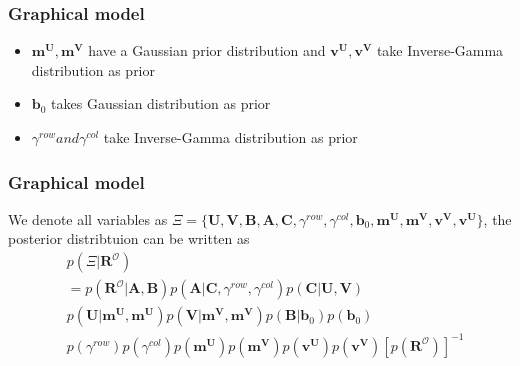 \documentclass{beamer}
\newcommand{\vect}[1]{\boldsymbol{\mathbf{#1}}} %
\newcommand{\vb}{\vect{b}}
\newcommand{\vB}{\vect{B}}
\newcommand{\vC}{\vect{C}}
\newcommand{\vU}{\vect{U}}
\newcommand{\vV}{\vect{V}}
\newcommand{\vv}{\vect{v}}
\newcommand{\vm}{\vect{m}}
\newcommand{\vR}{\vect{R}}
\newcommand{\vA}{\vect{A}}
\begin{document}
\begin{frame}
    \frametitle{Graphical model}
\begin{itemize}
    \item $\vm^{\vU}, \vm^{\vV}$ have a Gaussian prior distribution and $\vv^{\vU}, \vv^{\vV}$ take Inverse-Gamma distribution as prior 
    \item $\vb_0$ takes Gaussian distribution as prior
    \item $\gamma^{row} and \gamma^{col}$ take Inverse-Gamma distribution as prior
\end{itemize}
\end{frame}
\begin{frame}
    \frametitle{Graphical model}
    We denote all variables as $\Xi = \{\vU, \vV, \vB, \vA, \vC, \gamma^{row}, \gamma^{col}, \vb_0, \vm^{\vU},
    \vm^{\vV}, \vv^{\vV}, \vv^{\vU}\}$, the posterior distribtuion can be written as
    \begin{equation*}
	\begin{split}
	&p(\Xi|\vR^{\mathcal{O}}) \\
	&= p(\vR^{\mathcal{O}}|\vA, \vB) p(\vA|\vC, \gamma^{row}, \gamma^{col})p(\vC|\vU, \vV)\\
	&p(\vU|\vm^{\vU}, \vm^{\vU})p(\vV|\vm^{\vV}, \vm^{\vV})p(\vB|\vb_0)p(\vb_0)\\
	&p(\gamma^{row})p(\gamma^{col})p(\vm^{\vU})p(\vm^{\vV})p(\vv^{\vU})p(\vv^{\vV})[p(\vR^{\mathcal{O}})]^{-1}
	\end{split}
    \end{equation*}
\end{frame}
\end{document}
